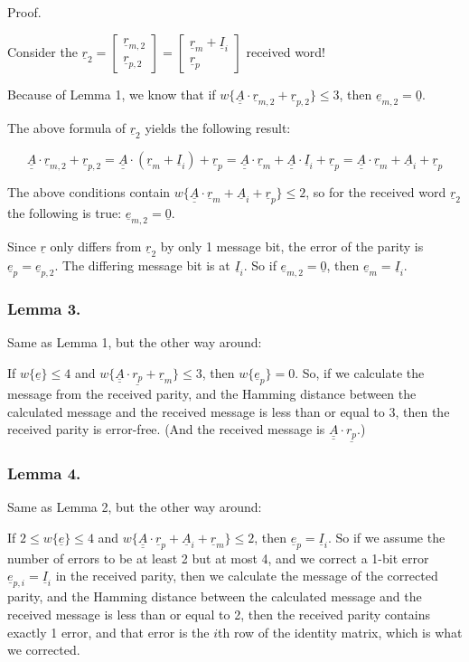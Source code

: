 \documentclass[11pt,a4paper,oneside]{report}             %
\def\doubleunderline#1{\underline{\underline{#1}}}
\def\dul#1{\doubleunderline{#1}}
\def\ul#1{\underline{#1}}
\newcommand{\vect}[2]{\begin{bmatrix} #1 \\ #2 \end{bmatrix}}
\begin{document}
Proof.

Consider the $\ul{r}_2 = \vect{\ul{r}_{m,2}}{\ul{r}_{p,2}} = \vect{\ul{r}_m + \ul{I}_i}{\ul{r}_p}$ received word!

Because of Lemma 1, we know that
if $w\{ \dul{A} \cdot \ul{r}_{m,2} + \ul{r}_{p,2} \} \leq 3$, then $\ul{e}_{m,2} = \ul{0}$.

The above formula of $\ul{r}_2$ yields the following result:

\[
    \dul{A} \cdot \ul{r}_{m,2} + \ul{r}_{p,2} =
    \dul{A} \cdot ( \ul{r}_m + \ul{I}_i ) + \ul{r}_p =
    \dul{A} \cdot \ul{r}_m + \dul{A} \cdot \ul{I}_i + \ul{r}_p =
    \dul{A} \cdot \ul{r}_m + \ul{A}_i + \ul{r}_p
\]

The above conditions contain $w \{ \dul{A} \cdot \ul{r}_m + \ul{A}_i + \ul{r}_p \} \leq 2$,
so for the received word $\ul{r}_2$ the following is true: $\ul{e}_{m,2} = \ul{0}$.

Since $\ul{r}$ only differs from $\ul{r}_2$ by only 1 message bit, the error of the parity is
$\ul{e}_p = \ul{e}_{p,2}$. The differing message bit is at $\ul{I}_i$.
So if $\ul{e}_{m,2} = \ul{0}$, then $\ul{e}_m = \ul{I}_i$.

\subsubsection{Lemma 3.}

Same as Lemma 1, but the other way around:

If $w\{\ul{e}\} \leq 4$ and $w\{\dul{A} \cdot \ul {r_p} + \ul{r}_m\} \leq 3$,
then $w\{\ul{e}_p\} = 0$. So, if we calculate the message from the received parity, and
the Hamming distance between the calculated message and the received message is less than
or equal to 3, then the received parity is error-free. (And the received message is
$\dul{A} \cdot \ul {r_p}$.)

\subsubsection{Lemma 4.}

Same as Lemma 2, but the other way around:

If $2 \leq w\{\ul{e}\} \leq 4$ and $w\{\dul{A} \cdot \ul{r}_p + \ul{A}_i + \ul{r}_m\} \leq 2$,
then $\ul{e}_p = \ul{I}_i$. So if we assume the number of errors to be at least 2 but at most 4,
and we correct a 1-bit error $\ul{e}_{p, i} = \ul{I}_i$ in the received parity, then we calculate
the message of the corrected parity, and the Hamming distance between the calculated message and
the received message is less than or equal to 2, then the received parity contains exactly 1 error,
and that error is the $i$th row of the identity matrix, which is what we corrected.
\end{document}
